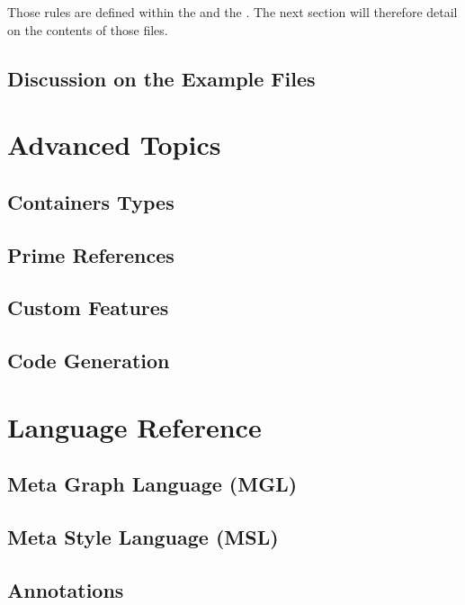 \documentclass[a4paper,american,12pt]{scrreprt}
\begin{document}
Those rules are defined within the  and the
. The next section will therefore detail on the contents
of those files.

\section{Discussion on the Example Files}
\label{sec:examplefiles}


\chapter{Advanced Topics}

\section{Containers Types}
\section{Prime References}
\section{Custom Features}
\section{Code Generation}

\chapter{Language Reference}

\section{Meta Graph Language (MGL)}
\section{Meta Style Language (MSL)}
\section{Annotations}




\end{document}
